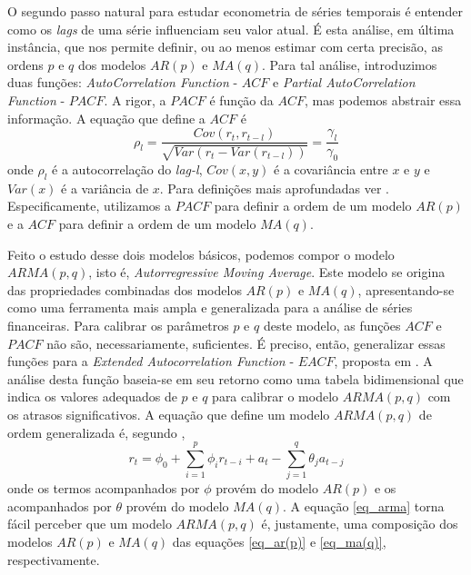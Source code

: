 \documentclass[12pt]{article}
\begin{document}
O segundo passo natural para estudar econometria de séries temporais é entender como os \textit{lags} de uma série influenciam seu valor atual. É esta análise, em última instância, que nos permite definir, ou ao menos estimar com certa precisão, as ordens $p$ e $q$ dos modelos $AR(p)$ e $MA(q)$. Para tal análise, introduzimos duas funções: \textit{AutoCorrelation Function } - $ACF $ e \textit{Partial AutoCorrelation Function } - $ PACF $. A rigor, a $ PACF $ é função da $ ACF $, mas podemos abstrair essa informação. A equação que define a $ ACF $ é
\begin{equation}\label{eq_acf}
\rho_{l}=\dfrac{Cov(r_{t},r_{t-l})}{\sqrt{Var(r_{t}-Var(r_{t-l}))}}=\dfrac{\gamma_{l}}{\gamma_{0}}
\end{equation}
onde $\rho_{l}$ é a autocorrelação do \textit{lag-l}, $Cov(x,y)$ é a covariância entre $x$ e $y$ e $Var(x)$ é a variância de $x$. Para definições mais aprofundadas ver \cite{Tsay}. Especificamente, utilizamos a $PACF$ para definir a ordem de um modelo $AR(p)$ e a $ACF$ para definir a ordem de um modelo $MA(q)$.

Feito o estudo desse dois modelos básicos, podemos compor o modelo $ARMA(p,q)$, isto
é, \textit{Autorregressive Moving Average}. Este modelo se origina das propriedades combinadas
dos modelos $AR(p)$ e $MA(q)$, apresentando-se como uma ferramenta mais ampla e
generalizada para a análise de séries financeiras. Para calibrar os parâmetros $p$ e $q$ deste
modelo, as funções $ ACF $ e $ PACF $ não são, necessariamente, suficientes. É preciso, então,
generalizar essas funções para a \textit{Extended Autocorrelation Function }- $ EACF $, proposta em \cite{Tsay-Tiao1984}. A análise desta função baseia-se em seu retorno como uma tabela bidimensional que indica os valores adequados de $p$ e $q$ para calibrar o modelo $ARMA(p,q)$ com os atrasos significativos. A equação que define um modelo $ARMA(p,q)$ de ordem generalizada é, segundo \cite{Tsay},
\begin{equation}\label{eq_arma}
r_{t}=\phi_{0}+\sum_{i=1}^{p}\phi_{i}r_{t-i}+a_{t}-\sum_{j=1}^{q}\theta_{j}a_{t-j}
\end{equation}
onde os termos acompanhados por $\phi$ provém do modelo $AR(p)$ e os acompanhados por $\theta$ provém do modelo $MA(q)$. A equação \ref{eq_arma} torna fácil perceber que um modelo $ARMA(p,q)$ é, justamente, uma composição dos modelos $AR(p)$ e $MA(q)$ das equações \ref{eq_ar(p)} e \ref{eq_ma(q)}, respectivamente. 
\end{document}
